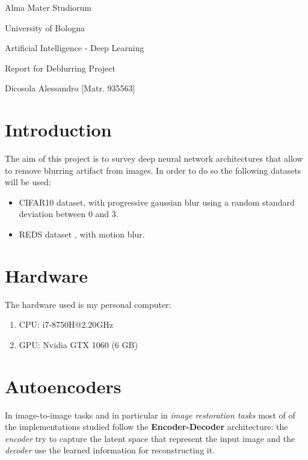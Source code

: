 \documentclass{article}
\begin{document}
\begin{titlepage}
    \vspace*{1cm}

    \begin{center}
        \Huge{Alma Mater Studiorum 
        
        University of Bologna }
    \end{center}

    \vspace*{5 cm}
    \begin{center}
        \LARGE{Artificial Intelligence - Deep Learning}

        \Large Report for Deblurring Project

        \large {Dicosola Alessandro [Matr. 935563]}
    \end{center}
\end{titlepage}

\section{Introduction}
The aim of this project is to survey deep neural network architectures that allow to remove blurring artifact from images.
\newline
In order to do so the following datasets will be used:
\begin{itemize}
    \item CIFAR10 \cite{cifar10dataset} dataset, with progressive gaussian blur using a random standard deviation between 0 and 3.
    \item REDS\cite{redsdataset} dataset , with motion blur.
\end{itemize}
\section{Hardware}
The hardware used is my personal computer:
\begin{enumerate}
    \item CPU: i7-8750H@2.20GHz
    \item GPU: Nvidia GTX 1060 (6 GB)
\end{enumerate}

\section{Autoencoders}
In image-to-image tasks and in particular in \textit{image restoration tasks} most of of the implementations studied follow the \textbf{Encoder-Decoder} architecture: the \textit{encoder} try to capture the latent space that represent the input image and the \textit{decoder} use the learned information for reconstructing it.
\end{document}
